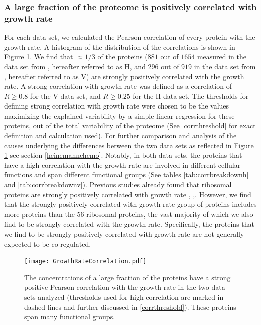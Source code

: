 \documentclass[notitlepage]{article}
\begin{document}
\subsubsection{A large fraction of the proteome is positively correlated with growth rate}
For each data set, we calculated the Pearson correlation of every protein with the growth rate.
A histogram of the distribution of the correlations is shown in Figure \ref{fig:growthcorr}.
We find that $\approx 1/3$ of the proteins ($881$ out of $1654$ measured in the data set from \cite{Heinemann2014}, hereafter referred to as H, and $296$ out of $919$ in the data set from \cite{Valgepea2013}, hereafter referred to as V) are strongly positively correlated with the growth rate.
A strong correlation with growth rate was defined as a correlation of $R\geq 0.8$ for the V data set, and $R\geq 0.25$ for the H data set.
The thresholds for defining strong correlation with growth rate were chosen to be the values maximizing the explained variability by a simple linear regression for these proteins, out of the total variability of the proteome (See \ref{corrthreshold} for exact definition and calculation used).
For further comparison and analysis of the causes underlying the differences between the two data sets as reflected in Figure \ref{fig:growthcorr} see section \ref{heinemannchemo}.
Notably, in both data sets, the proteins that have a high correlation with the growth rate are involved in different cellular functions and span different functional groups (See tables \ref{tab:corrbreakdownh} and \ref{tab:corrbreakdownv}).
Previous studies already found that ribosomal proteins are strongly positively correlated with growth rate \cite{Pedersen1978a}, \cite{ingraham1983growth},\cite{Klumpp2008}.
However, we find that the strongly positively correlated with growth rate group of proteins includes more proteins than the 56 ribosomal proteins, the vast majority of which we also find to be strongly correlated with the growth rate.
Specifically, the proteins that we find to be strongly positively correlated with growth rate are not generally expected to be co-regulated.

\begin{figure}[h]
\centering
\texttt{[image: GrowthRateCorrelation.pdf]}
\caption{
The concentrations of a large fraction of the proteins have a strong positive Pearson correlation with the growth rate in the two data sets analyzed (thresholds used for high correlation are marked in dashed lines and further discussed in \ref{corrthreshold}).
These proteins span many functional groups.
}
\label{fig:growthcorr}
\end{figure}
\end{document}
